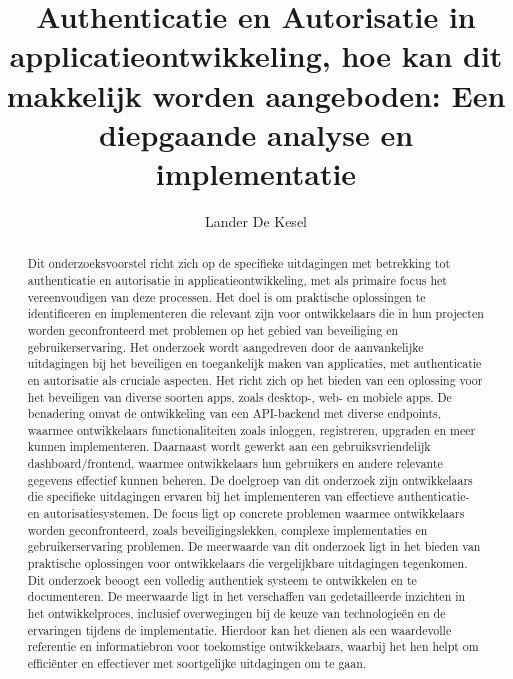 \documentclass{hogent-article}
\title{Authenticatie en Autorisatie in applicatieontwikkeling, hoe kan dit makkelijk worden aangeboden: Een diepgaande analyse en implementatie}
\author{Lander De Kesel}
\begin{document}
\begin{abstract}
Dit onderzoeksvoorstel richt zich op de specifieke uitdagingen met betrekking tot authenticatie en autorisatie in applicatieontwikkeling, met als primaire 
focus het vereenvoudigen van deze processen. Het doel is om praktische oplossingen te identificeren en implementeren die relevant zijn voor ontwikkelaars 
die in hun projecten worden geconfronteerd met problemen op het gebied van beveiliging en gebruikerservaring. 
\newline
\newline
Het onderzoek wordt aangedreven door de aanvankelijke uitdagingen bij het beveiligen en toegankelijk maken van applicaties, met authenticatie en 
autorisatie als cruciale aspecten. Het richt zich op het bieden van een oplossing voor het beveiligen van diverse soorten apps, zoals desktop-, 
web- en mobiele apps. De benadering omvat de ontwikkeling van een API-backend met diverse endpoints, waarmee ontwikkelaars functionaliteiten zoals 
inloggen, registreren, upgraden en meer kunnen implementeren. Daarnaast wordt gewerkt aan een gebruiksvriendelijk dashboard/frontend, waarmee 
ontwikkelaars hun gebruikers en andere relevante gegevens effectief kunnen beheren. 
\newline
\newline
De doelgroep van dit onderzoek zijn ontwikkelaars die specifieke uitdagingen ervaren bij het implementeren van effectieve authenticatie- en 
autorisatiesystemen. De focus ligt op concrete problemen waarmee ontwikkelaars worden geconfronteerd, zoals beveiligingslekken, complexe implementaties 
en gebruikerservaring problemen. 
\newline
\newline
De meerwaarde van dit onderzoek ligt in het bieden van praktische oplossingen voor ontwikkelaars die vergelijkbare uitdagingen tegenkomen. 
Dit onderzoek beoogt een volledig authentiek systeem te ontwikkelen en te documenteren. De meerwaarde ligt in het verschaffen van gedetailleerde 
inzichten in het ontwikkelproces, inclusief overwegingen bij de keuze van technologieën en de ervaringen tijdens de implementatie. Hierdoor kan het 
dienen als een waardevolle referentie en informatiebron voor toekomstige ontwikkelaars, waarbij het hen helpt om efficiënter en effectiever met 
soortgelijke uitdagingen om te gaan.
\end{abstract}

\tableofcontents



\printbibliography[heading=bibintoc]
\end{document}
